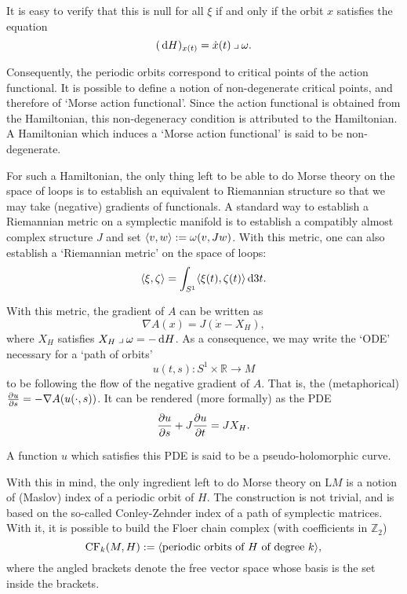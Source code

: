 \documentclass{article}
\theoremstyle{nonumberplain}
\newcommand{\R}{\mathbb{R}}
\newcommand{\Z}{\mathbb{Z}}
\newcommand{\LL}{\mathrm{L}}
\newcommand{\CF}{\mathrm{CF}}
\newcommand{\grad}{\nabla}
\newcommand{\into}{\mathbin{\lrcorner}}
\DeclarePairedDelimiter{\braket}{\langle}{\rangle}
\begin{document}
It is easy to verify that this is null for all $\xi$ if and only if the orbit $x$ satisfies the equation
\begin{equation}
(\dl H)_{x(t)} = \dot x(t) \into \omega.
\end{equation}

Consequently, the periodic orbits correspond to critical points of the action functional. It is possible to define a notion of non-degenerate critical points, and therefore of `Morse action functional'. Since the action functional is obtained from the Hamiltonian, this non-degeneracy condition is attributed to the Hamiltonian. A Hamiltonian which induces a `Morse action functional' is said to be non-degenerate.

For such a Hamiltonian, the only thing left to be able to do Morse theory on the space of loops is to establish an equivalent to Riemannian structure so that we may take (negative) gradients of functionals. A standard way to establish a Riemannian metric on a symplectic manifold is to establish a compatibly almost complex structure $J$ and set $\braket{v,w} := \omega(v, Jw)$. With this metric, one can also establish a `Riemannian metric' on the space of loops:
\begin{equation}
\braket{\xi, \zeta} = \int_{S^1} \braket{\xi(t), \zeta(t)} \dl3t.
\end{equation}

With this metric, the gradient of $A$ can be written as
\begin{equation}
\grad A(x) = J(\dot x - X_H),
\end{equation}
where $X_H$ satisfies $X_H \into \omega = - \dl H$. As a consequence, we may write the `ODE' necessary for a `path of orbits'
\begin{equation}
u(t,s) \colon S^1 \times \R \to M
\end{equation}
to be following the flow of the negative gradient of $A$. That is, the (metaphorical) $\diffp u s = - \grad A(u(\cdot, s))$. It can be rendered (more formally) as the PDE
\begin{equation}
\diffp u s + J \diffp u t = J X_H.
\end{equation}

A function $u$ which satisfies this PDE is said to be a pseudo-holomorphic curve.

With this in mind, the only ingredient left to do Morse theory on $\LL M$ is a notion of (Maslov) index of a periodic orbit of $H$. The construction is not trivial, and is based on the so-called Conley-Zehnder index of a path of symplectic matrices. With it, it is possible to build the Floer chain complex (with coefficients in $\Z_2$)
\begin{equation}
\CF_k(M, H) := \braket{\text{periodic orbits of $H$ of degree $k$}},
\end{equation}
where the angled brackets denote the free vector space whose basis is the set inside the brackets.
\end{document}
